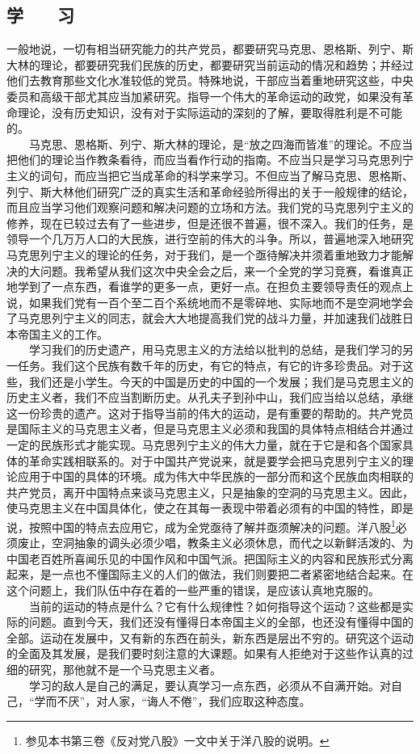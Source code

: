 \documentclass[cn,11pt,chinese]{elegantbook}
\def\myformat#1{\hfil\hfil #1}
\begin{document}
\subsection*{\myformat{学　　习}}
一般地说，一切有相当研究能力的共产党员，都要研究马克思、恩格斯、列宁、斯大林的理论，都要研究我们民族的历史，都要研究当前运动的情况和趋势；并经过他们去教育那些文化水准较低的党员。特殊地说，干部应当着重地研究这些，中央委员和高级干部尤其应当加紧研究。指导一个伟大的革命运动的政党，如果没有革命理论，没有历史知识，没有对于实际运动的深刻的了解，要取得胜利是不可能的。\\
　　马克思、恩格斯、列宁、斯大林的理论，是“放之四海而皆准”的理论。不应当把他们的理论当作教条看待，而应当看作行动的指南。不应当只是学习马克思列宁主义的词句，而应当把它当成革命的科学来学习。不但应当了解马克思、恩格斯、列宁、斯大林他们研究广泛的真实生活和革命经验所得出的关于一般规律的结论，而且应当学习他们观察问题和解决问题的立场和方法。我们党的马克思列宁主义的修养，现在已较过去有了一些进步，但是还很不普遍，很不深入。我们的任务，是领导一个几万万人口的大民族，进行空前的伟大的斗争。所以，普遍地深入地研究马克思列宁主义的理论的任务，对于我们，是一个亟待解决并须着重地致力才能解决的大问题。我希望从我们这次中央全会之后，来一个全党的学习竞赛，看谁真正地学到了一点东西，看谁学的更多一点，更好一点。在担负主要领导责任的观点上说，如果我们党有一百个至二百个系统地而不是零碎地、实际地而不是空洞地学会了马克思列宁主义的同志，就会大大地提高我们党的战斗力量，并加速我们战胜日本帝国主义的工作。\\
　　学习我们的历史遗产，用马克思主义的方法给以批判的总结，是我们学习的另一任务。我们这个民族有数千年的历史，有它的特点，有它的许多珍贵品。对于这些，我们还是小学生。今天的中国是历史的中国的一个发展；我们是马克思主义的历史主义者，我们不应当割断历史。从孔夫子到孙中山，我们应当给以总结，承继这一份珍贵的遗产。这对于指导当前的伟大的运动，是有重要的帮助的。共产党员是国际主义的马克思主义者，但是马克思主义必须和我国的具体特点相结合并通过一定的民族形式才能实现。马克思列宁主义的伟大力量，就在于它是和各个国家具体的革命实践相联系的。对于中国共产党说来，就是要学会把马克思列宁主义的理论应用于中国的具体的环境。成为伟大中华民族的一部分而和这个民族血肉相联的共产党员，离开中国特点来谈马克思主义，只是抽象的空洞的马克思主义。因此，使马克思主义在中国具体化，使之在其每一表现中带着必须有的中国的特性，即是说，按照中国的特点去应用它，成为全党亟待了解并亟须解决的问题。洋八股\footnote[11]{ 参见本书第三卷《反对党八股》一文中关于洋八股的说明。}必须废止，空洞抽象的调头必须少唱，教条主义必须休息，而代之以新鲜活泼的、为中国老百姓所喜闻乐见的中国作风和中国气派。把国际主义的内容和民族形式分离起来，是一点也不懂国际主义的人们的做法，我们则要把二者紧密地结合起来。在这个问题上，我们队伍中存在着的一些严重的错误，是应该认真地克服的。\\
　　当前的运动的特点是什么？它有什么规律性？如何指导这个运动？这些都是实际的问题。直到今天，我们还没有懂得日本帝国主义的全部，也还没有懂得中国的全部。运动在发展中，又有新的东西在前头，新东西是层出不穷的。研究这个运动的全面及其发展，是我们要时刻注意的大课题。如果有人拒绝对于这些作认真的过细的研究，那他就不是一个马克思主义者。\\
　　学习的敌人是自己的满足，要认真学习一点东西，必须从不自满开始。对自己，“学而不厌”，对人家，“诲人不倦”，我们应取这种态度。\\
\end{document}

